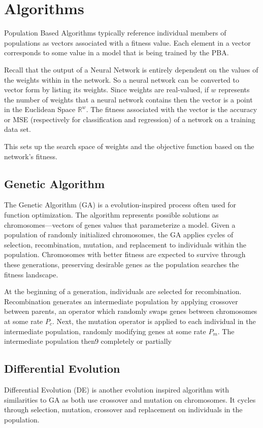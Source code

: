 \documentclass[twoside,11pt]{article}
\begin{document}
\section{Algorithms}

	Population Based Algorithms typically reference individual members of populations as vectors associated with a fitness value. Each element in a vector corresponds to some value in a model that is being trained by the PBA.
	
	Recall that the output of a Neural Network is entirely dependent on the values of the weights within in the network. 
	So a neural network can be converted to vector form by listing its weights.
	Since weights are real-valued, if $w$ represents the number of weights that a neural network contains then the vector is a point in the Euclidean Space $\mathbb{R}^w$. 
	The fitness associated with the vector is the accuracy or MSE (respectively for classification and regression) of a network on a training data set. 
	
	This sets up the search space of weights and the objective function based on the network's fitness.

\subsection{Genetic Algorithm}

The Genetic Algorithm (GA) is a evolution-inspired process often used for function optimization. The algorithm represents possible solutions as chromosomes---vectors of genes values that parameterize a model. Given a population of randomly initialized chromosomes, the GA applies cycles of selection, recombination, mutation, and replacement to individuals within the population. Chromosomes with better fitness are expected to survive through these generations, preserving desirable genes as the population searches the fitness landscape.

At the beginning of a generation, individuals are selected for recombination. Recombination generates an intermediate population by applying crossover between parents, an operator which randomly swaps genes between chromosomes at some rate $P_c$. Next, the mutation operator is applied to each individual in the intermediate population, randomly modifying genes at some rate $P_m$. The intermediate population then9 completely or partially 




\subsection{Differential Evolution}
Differential Evolution (DE) is another evolution inspired algorithm with  similarities to GA as both use crossover and mutation on chromosomes. It cycles through selection, mutation, crossover and replacement on individuals in the population. 
\end{document}
